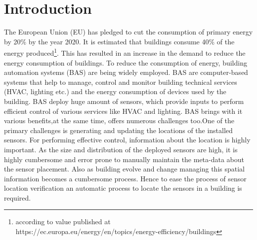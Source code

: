 \chapter{Introduction}
\label{chp:introduction}

The European Union (EU) has pledged to cut the consumption of primary energy by 20\% by the year 2020.  It is estimated that buildings consume 40\% of the energy produced\footnote{according to value published at https://ec.europa.eu/energy/en/topics/energy-efficiency/buildings }.  This has resulted in an increase in the demand to reduce the energy consumption of buildings. To reduce the consumption of energy, building automation systems (BAS) are being widely employed. BAS are computer-based systems that help to manage, control and monitor building technical services (HVAC, lighting etc.) and the energy consumption of devices used by the building.  BAS deploy huge amount of sensors, which provide inputs to perform efficient control of various services like HVAC and lighting. BAS brings with it various benefits,at the same time, offers numerous challenges too.One of the primary challenges is generating and updating the locations of the installed sensors.  For performing effective control, information about the location is highly important. As the size and distribution of the deployed sensors are high, it is highly cumbersome and error prone to manually maintain the meta-data about the sensor placement. Also as building evolve and change managing this spatial information becomes a cumbersome process. Hence to ease the process of sensor location verification an automatic process to locate the sensors in a building is required.






\vspace{1\baselineskip}

\noindent

